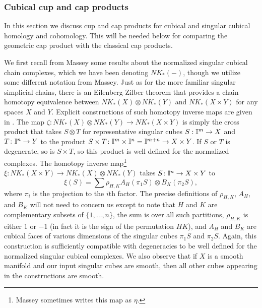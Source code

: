 \subsubsection{Cubical cup and cap products}\label{S: cubical products}

In this section we discuss cup and cap products for cubical and singular cubical homology and cohomology.
This will be needed below for comparing the geometric cap product with the classical cap products.

We first recall from Massey \cite[Chapter XI]{Mas91} some results about the normalized singular cubical chain complexes, which we have been denoting $NK_*(-)$, though we utilize some different notation from Massey.
Just as for the more familiar singular simplicial chains, there is an Eilenberg-Zilber theorem that provides a chain homotopy equivalence between $NK_*(X) \otimes NK_*(Y)$ and $NK_*(X \times Y)$ for any spaces $X$ and $Y$.
Explicit constructions of such homotopy inverse maps are given in \cite[Section XI.5]{Mas91}.
The map $\zeta: NK_*(X) \otimes NK_*(Y) \to NK_*(X \times Y)$ is simply the cross product that takes $S \otimes T$ for representative singular cubes $S: \mathbb{I}^m \to X$ and $T \colon \mathbb{I}^n \to Y$ to the product $S \times T \colon \mathbb{I}^m \times \mathbb{I}^n = \mathbb{I}^{m+n} \to X \times Y$.
If $S$ or $T$ is degenerate, so is $S \times T$, so this product is well defined for the normalized complexes.
The homotopy inverse map\footnote{Massey sometimes writes this map as $\eta$.} $\xi: NK_*(X \times Y) \to NK_*(X) \otimes NK_*(Y)$ takes $S \colon \mathbb{I}^n \to X \times Y$ to
$$\xi(S) = \sum \rho_{H,K}A_H(\pi_1S) \otimes B_K(\pi_2S),$$ where $\pi_i$ is the projection to the $i$th factor.
The precise definitions of $\rho_{H,K}$, $A_H$, and $B_K$ will not need to concern us except to note that $H$ and $K$ are complementary subsets of $\{1,\ldots, n\}$, the sum is over all such partitions, $\rho_{H,K}$ is either $1$ or $-1$ (in fact it is the sign of the permutation $HK$), and $A_H$ and $B_K$ are cubical faces of various dimensions of the singular cubes $\pi_1S$ and $\pi_2S$.
Again, this construction is sufficiently compatible with degeneracies to be well defined for the normalized singular cubical complexes.
We also observe that if $X$ is a smooth manifold and our input singular cubes are smooth, then all other cubes appearing in the constructions are smooth.

